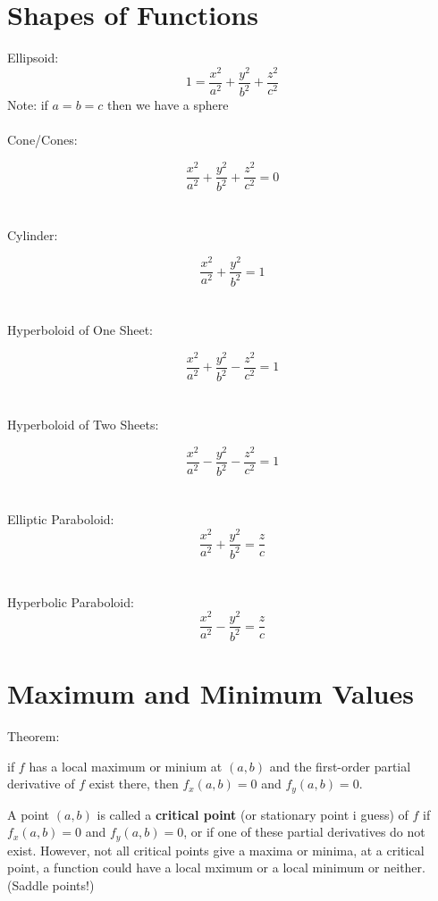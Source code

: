 \documentclass{article}
\begin{document}
\newpage
\section{Shapes of Functions}


Ellipsoid:
$$1 = \frac{x^2}{a^2} + \frac{y^2}{b^2} + \frac{z^2}{c^2}$$
Note: if $a = b = c$ then we have a sphere
\\\\


Cone/Cones:

$$\frac{x^2}{a^2} + \frac{y^2}{b^2} + \frac{z^2}{c^2} = 0$$
\\\\ 


Cylinder:

$$\frac{x^2}{a^2} + \frac{y^2}{b^2} = 1$$
\\\\

Hyperboloid of One Sheet:

$$\frac{x^2}{a^2} + \frac{y^2}{b^2} - \frac{z^2}{c^2} = 1$$
\\\\

Hyperboloid of Two Sheets:

$$\frac{x^2}{a^2} - \frac{y^2}{b^2} - \frac{z^2}{c^2} = 1$$
\\\\

Elliptic Paraboloid:
$$\frac{x^2}{a^2} + \frac{y^2}{b^2}  = \frac{z}{c}$$
\\\\

Hyperbolic Paraboloid:
$$\frac{x^2}{a^2} - \frac{y^2}{b^2} = \frac{z}{c}$$



\newpage
\section{Maximum and Minimum Values}

Theorem:
\begin{center}
    if $f$ has a local maximum or minium at $(a,b)$ and the first-order partial derivative of $f$ exist there, then $f_x(a,b) = 0$ and $f_y(a,b) = 0$.
\end{center}

A point $(a,b)$ is called a \textbf{critical point} (or stationary point i guess) of $f$ if $f_x(a,b) = 0$ and $f_y(a,b) = 0$, or if one of these partial derivatives do not exist. However, not all critical points give a maxima or minima, at a critical point, a function could have a local mximum or a local minimum or neither. (Saddle points!) 
\end{document}
